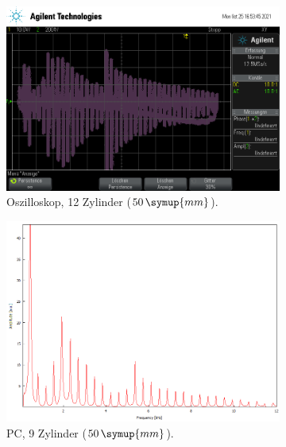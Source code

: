 \begin{figure}
\begin{subfigure}[b]{0.3\textwidth}
        \includegraphics[width=\textwidth]{data/1_1zylinder50mm/scope_12.png}
        \caption{Oszilloskop, 12 Zylinder ($50 \, \symup{mm}$).}
    \end{subfigure}
    \hfill
    \begin{subfigure}[b]{0.3\textwidth}
        \centering
        \includegraphics[width=\textwidth]{data/1_2zylinder50mmPC/9.png}
        \caption{PC, 9 Zylinder ($50 \, \symup{mm}$).}
    \end{subfigure}
    \hfill
    \begin{subfigure}[b]{0.3\textwidth}
        \centering

\end{subfigure}
\end{figure}
